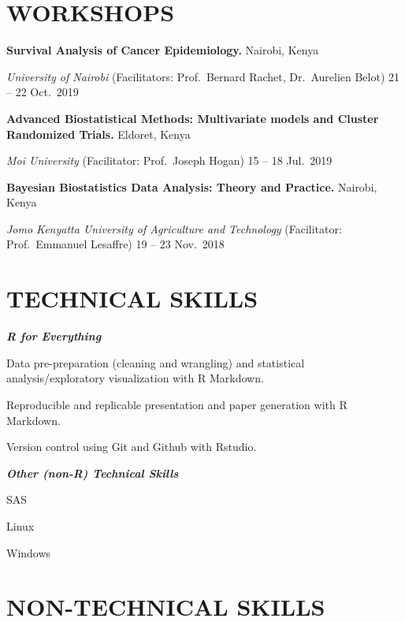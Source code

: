 \documentclass[13pt,]{article}
\providecommand{\tightlist}{%
  \setlength{\itemsep}{0pt}\setlength{\parskip}{0pt}}
\renewenvironment{itemize}{
  \begin{list}{}{
    \setlength{\leftmargin}{1.5em}
  }
}{
  \end{list}
}
\begin{document}
\hypertarget{workshops}{%
\section{\texorpdfstring{\textbf{WORKSHOPS}}{WORKSHOPS}}\label{workshops}}

\textbf{Survival Analysis of Cancer Epidemiology. } \hfill Nairobi,
Kenya

\emph{University of Nairobi} (Facilitators: Prof.~Bernard Rachet,
Dr.~Aurelien Belot) \hfill 21 -- 22 Oct.~2019

\textbf{Advanced Biostatistical Methods: Multivariate models and Cluster
Randomized Trials. } \hfill Eldoret, Kenya

\emph{Moi University} (Facilitator: Prof.~Joseph Hogan) \hfill 15 -- 18
Jul.~2019

\textbf{Bayesian Biostatistics Data Analysis: Theory and Practice. }
\hfill Nairobi, Kenya

\emph{Jomo Kenyatta University of Agriculture and Technology}
(Facilitator: Prof.~Emmanuel Lesaffre) \hfill 19 -- 23 Nov.~2018

\hypertarget{technical-skills}{%
\section{\texorpdfstring{\textbf{TECHNICAL
SKILLS}}{TECHNICAL SKILLS}}\label{technical-skills}}

\emph{\textbf{R for Everything}}

\begin{itemize}
\tightlist
\item
  Data pre-preparation (cleaning and wrangling) and statistical
  analysis/exploratory visualization with R Markdown.
\item
  Reproducible and replicable presentation and paper generation with R
  Markdown.
\item
  Version control using Git and Github with Rstudio.
\end{itemize}

\emph{\textbf{Other (non-R) Technical Skills}}

\begin{itemize}
\tightlist
\item
  SAS
\item
  Linux
\item
  Windows
\end{itemize}

\hypertarget{non-technical-skills}{%
\section{\texorpdfstring{\textbf{NON-TECHNICAL
SKILLS}}{NON-TECHNICAL SKILLS}}\label{non-technical-skills}}
\end{document}
